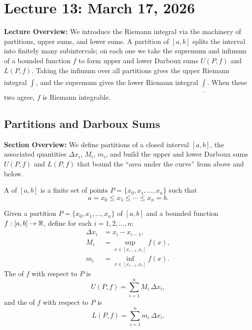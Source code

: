 \documentclass[../master/master.tex]{subfiles}
\begin{document}
\renewcommand{\lecturenum}{13}
\renewcommand{\lecturedate}{March 17, 2026}
\renewcommand{\lecturetopic}{The Riemann Integral}

\section{Lecture \lecturenum : \lecturedate}

\begin{lecturesummary}
\textbf{Lecture Overview:} We introduce the Riemann integral via the machinery of partitions, upper sums, and lower sums. A partition of $[a,b]$ splits the interval into finitely many subintervals; on each one we take the supremum and infimum of a bounded function $f$ to form upper and lower Darboux sums $U(P,f)$ and $L(P,f)$. Taking the infimum over all partitions gives the upper Riemann integral $\overline{\int}$, and the supremum gives the lower Riemann integral $\underline{\int}$. When these two agree, $f$ is Riemann integrable.
\end{lecturesummary}

\subsection{Partitions and Darboux Sums}

\begin{summarybox}
\textbf{Section Overview:} We define partitions of a closed interval $[a,b]$, the associated quantities $\Delta x_i$, $M_i$, $m_i$, and build the upper and lower Darboux sums $U(P,f)$ and $L(P,f)$ that bound the ``area under the curve'' from above and below.
\end{summarybox}

\begin{definition}
A  of $[a,b]$ is a finite set of points $P = \{x_0, x_1, \dots, x_n\}$ such that
\[
a = x_0 \leq x_1 \leq \cdots \leq x_n = b.
\]
\end{definition}

\begin{definition}
Given a partition $P = \{x_0, x_1, \dots, x_n\}$ of $[a,b]$ and a bounded function $f: [a,b] \to \mathbb{R}$, define for each $i = 1, 2, \dots, n$:
\begin{align*}
\Delta x_i &= x_i - x_{i-1}, \\
M_i &= \sup_{x \in [x_{i-1}, x_i]} f(x), \\
m_i &= \inf_{x \in [x_{i-1}, x_i]} f(x).
\end{align*}
The  of $f$ with respect to $P$ is
\[
U(P, f) = \sum_{i=1}^{n} M_i \, \Delta x_i,
\]
and the  of $f$ with respect to $P$ is
\[
L(P, f) = \sum_{i=1}^{n} m_i \, \Delta x_i.
\]
\end{definition}
\end{document}
